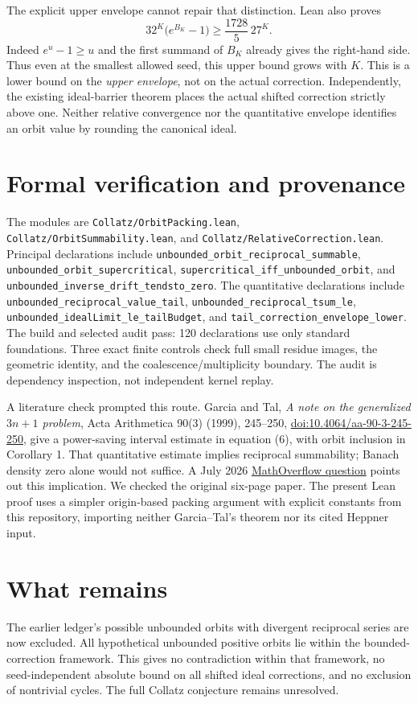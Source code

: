 \documentclass[10pt]{article}
\begin{document}
The explicit upper envelope cannot repair that distinction. Lean also proves
\[
32^K\bigl(e^{B_K}-1\bigr)\ge\frac{1728}{5}\,27^K.
\]
Indeed $e^u-1\ge u$ and the first summand of $B_K$ already gives the
right-hand side. Thus even at the smallest allowed seed, this upper bound
grows with $K$. This is a lower bound on the \emph{upper envelope}, not on
the actual correction. Independently, the existing ideal-barrier theorem
places the actual shifted correction strictly above one. Neither relative
convergence nor the quantitative envelope identifies an orbit value by
rounding the canonical ideal.

\section{Formal verification and provenance}
{\raggedright
The modules are \texttt{Collatz/OrbitPacking.lean},
\texttt{Collatz/OrbitSummability.lean}, and
\texttt{Collatz/RelativeCorrection.lean}. Principal declarations include
\texttt{unbounded\_orbit\_reciprocal\_summable},
\texttt{unbounded\_orbit\_supercritical},
\texttt{supercritical\_iff\_unbounded\_orbit}, and
\texttt{unbounded\_inverse\_drift\_tendsto\_zero}.
The quantitative declarations include
\texttt{unbounded\_reciprocal\_value\_tail},
\texttt{unbounded\_reciprocal\_tsum\_le},
\texttt{unbounded\_idealLimit\_le\_tailBudget}, and
\texttt{tail\_correction\_envelope\_lower}.
The build and selected audit pass: 120 declarations use only standard
foundations. Three exact finite controls check full small residue images,
the geometric identity, and the coalescence/multiplicity boundary.
The audit is dependency inspection, not independent kernel replay.\par}

A literature check prompted this route. Garcia and Tal,
\emph{A note on the generalized $3n+1$ problem}, Acta Arithmetica 90(3)
(1999), 245--250,
\href{https://doi.org/10.4064/aa-90-3-245-250}{doi:10.4064/aa-90-3-245-250},
give a power-saving interval estimate in equation (6), with orbit inclusion
in Corollary 1. That quantitative estimate implies reciprocal summability;
Banach density zero alone would not suffice. A July 2026
\href{https://mathoverflow.net/questions/513539}{MathOverflow question}
points out this implication. We checked the original six-page paper.
The present Lean proof uses a simpler origin-based packing argument with
explicit constants from this repository, importing neither Garcia--Tal's
theorem nor its cited Heppner input.

\section{What remains}
The earlier ledger's possible unbounded orbits with divergent reciprocal
series are now excluded. All hypothetical unbounded positive orbits lie
within the bounded-correction framework. This gives no contradiction within
that framework, no seed-independent absolute bound on all shifted ideal
corrections, and no exclusion of nontrivial cycles. The full Collatz
conjecture remains unresolved.
\end{document}
